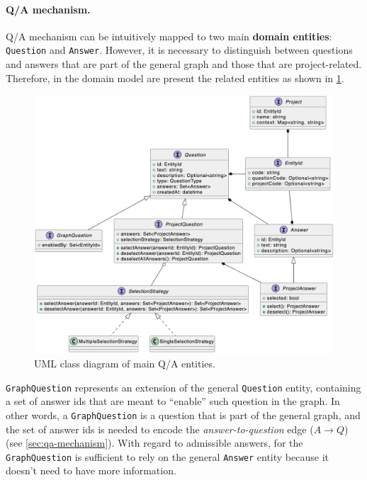 \documentclass[12pt,a4paper,openright,twoside]{book}
\begin{document}
\paragraph{\ac{Q/A} mechanism.}

\ac{Q/A} mechanism can be intuitively mapped to two main \textbf{domain entities}: \texttt{Question} and \texttt{Answer}.
%
However, it is necessary to distinguish between questions and answers that are part of the general graph and those that are project-related.
%
Therefore, in the domain model are present the related entities as shown in \cref{fig:entities}.

\begin{figure}
    \centering
    \includegraphics[width=\linewidth]{figures/diagrams/entities.png}
    \caption{
        UML class diagram of main \ac{Q/A} entities.
    }
    \label{fig:entities}
\end{figure}

\texttt{GraphQuestion} represents an extension of the general \texttt{Question} entity, containing a set of answer ids that are meant to ``enable'' such question in the graph.
%
In other words, a \texttt{GraphQuestion} is a question that is part of the general graph, and the set of answer ids is needed to encode the \textit{answer-to-question} edge ($A \to Q$) (see \cref{sec:qa-mechanism}).
%
With regard to admissible answers, for the \texttt{GraphQuestion} is sufficient to rely on the general \texttt{Answer} entity because it doesn't need to have more information.
\end{document}
